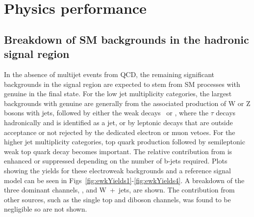 \section{Physics performance}
\label{sec:physics}

%

\subsection{Breakdown of SM backgrounds in the hadronic signal
  region\label{sec:bkgd-comp}}

In the absence of multijet events from QCD, the remaining significant
backgrounds in the signal region are expected to stem from SM
processes with genuine \met in the final state. For the low jet
multiplicity categories, the largest backgrounds with genuine \met are
generally from the associated production of W or Z bosons with jets,
followed by either the weak decays \znunu\ or \wtaunu, where the
$\tau$ decays hadronically and is identified as a jet, or by leptonic
decays that are outside acceptance or not rejected by the dedicated
electron or muon vetoes. For the higher jet multiplicity categories,
top quark production followed by semileptonic weak top quark decay
becomes important. The relative contribution from \ttbar is enhanced
or suppressed depending on the number of b-jets required. 
Plots showing the yields for these electroweak backgrounds and a reference
signal model can be seen in Figs~\ref{fig:ewkYields1}-\ref{fig:ewkYields4}. 
A breakdown of the three
dominant channels, \ttbar, \zinv and W~+~jets, are shown. The contribution from
other sources, such as the single top and diboson channels, was found to be
negligible so are not shown.

